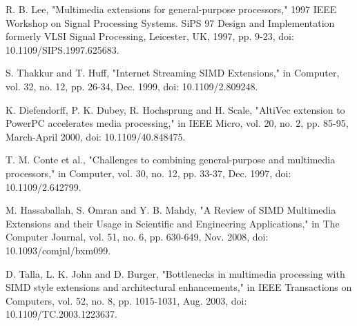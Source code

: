 \documentclass[conference]{IEEEtran}
\begin{document}
\begin{thebibliography}{00}
 R. B. Lee, "Multimedia extensions for general-purpose processors," 1997 IEEE Workshop on Signal Processing Systems. SiPS 97 Design and Implementation formerly VLSI Signal Processing, Leicester, UK, 1997, pp. 9-23, doi: 10.1109/SIPS.1997.625683.

 S. Thakkur and T. Huff, "Internet Streaming SIMD Extensions," in Computer, vol. 32, no. 12, pp. 26-34, Dec. 1999, doi: 10.1109/2.809248.

 K. Diefendorff, P. K. Dubey, R. Hochsprung and H. Scale, "AltiVec extension to PowerPC accelerates media processing," in IEEE Micro, vol. 20, no. 2, pp. 85-95, March-April 2000, doi: 10.1109/40.848475.

 T. M. Conte et al., "Challenges to combining general-purpose and multimedia processors," in Computer, vol. 30, no. 12, pp. 33-37, Dec. 1997, doi: 10.1109/2.642799.

 M. Hassaballah, S. Omran and Y. B. Mahdy, "A Review of SIMD Multimedia Extensions and their Usage in Scientific and Engineering Applications," in The Computer Journal, vol. 51, no. 6, pp. 630-649, Nov. 2008, doi: 10.1093/comjnl/bxm099.

 D. Talla, L. K. John and D. Burger, "Bottlenecks in multimedia processing with SIMD style extensions and architectural enhancements," in IEEE Transactions on Computers, vol. 52, no. 8, pp. 1015-1031, Aug. 2003, doi: 10.1109/TC.2003.1223637.



\end{thebibliography}
\end{document}
